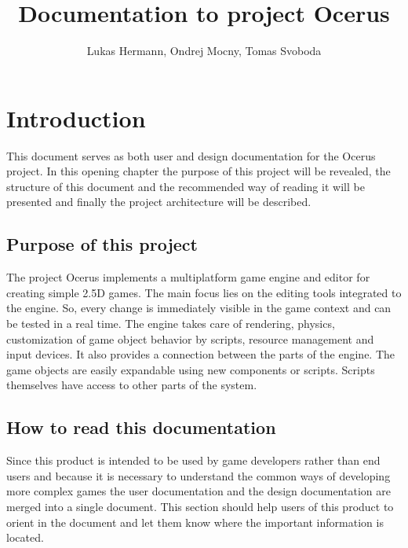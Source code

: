 \documentclass[a4paper, 12pt]{report}
\begin{document}
\pagestyle{empty} %

\title{Documentation to project Ocerus}
\author{Lukas Hermann, Ondrej Mocny, Tomas Svoboda}
\maketitle

\pagestyle{plain} %

\tableofcontents %
\cleardoublepage %

\chapter{Introduction}

This document serves as both user and design documentation for the Ocerus project. In this opening chapter the purpose of this project will be revealed, the structure of this document and the recommended way of reading it will be presented and finally the project architecture will be described.

\section{Purpose of this project}

The project Ocerus implements a multiplatform game engine and editor for creating simple 2.5D games. The main focus lies on the editing tools integrated to the engine. So, every change is immediately visible in the game context and can be tested in a real time. The engine takes care of rendering, physics, customization of game object behavior by scripts, resource management and input devices. It also provides a connection between the parts of the engine. The game objects are easily expandable using new components or scripts. Scripts themselves have access to other parts of the system.

\section{How to read this documentation}

Since this product is intended to be used by game developers rather than end users and because it is necessary to understand the common ways of developing more complex games the user documentation and the design documentation are merged into a single document. This section should help users of this product to orient in the document and let them know where the important information is located.
\end{document}
